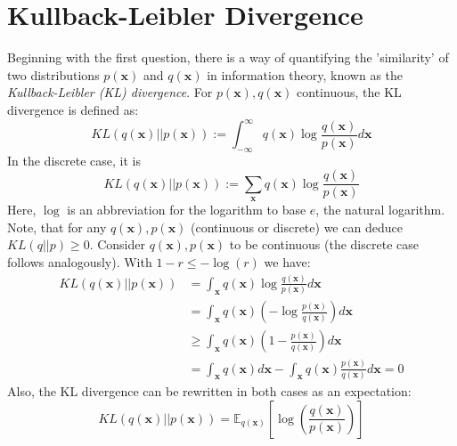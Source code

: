 \documentclass[12pt]{report}
\theoremstyle{definition}
\begin{document}
\section{Kullback-Leibler Divergence}
Beginning with the first question, there is a way of quantifying the 'similarity' of two distributions $p(\mathbf{x})$ and $q(\mathbf{x})$ in information theory, known as the \emph{Kullback-Leibler (KL) divergence}. For $p(\mathbf{x}), q(\mathbf{x})$ continuous, the KL divergence is defined as:
\begin{equation}
	KL(q(\mathbf{x})||p(\mathbf{x})) := \int_{-\infty}^{\infty} q(\mathbf{x}) \log \frac{q(\mathbf{x})}{p(\mathbf{x})} d \mathbf{x}
\end{equation}
In the discrete case, it is
\begin{equation}
	KL(q(\mathbf{x})||p(\mathbf{x})) := \sum_{\mathbf{x}} q(\mathbf{x}) \log \frac{q(\mathbf{x})}{p(\mathbf{x})}
\end{equation}
Here, $\log$ is an abbreviation for the logarithm to base $e$, the natural logarithm. Note, that for any $q(\mathbf{x}), p(\mathbf{x})$ (continuous or discrete) we can deduce $KL(q||p) \geq 0$.
Consider $q(\mathbf{x}), p(\mathbf{x})$ to be continuous (the discrete case follows analogously). With $1 - r \leq -\log(r)$ we have:
\begin{equation}
\begin{split}
KL(q(\mathbf{x})||p(\mathbf{x}))
& = \int_{\mathbf{x}} q(\mathbf{x}) \log \frac{q(\mathbf{x})}{p(\mathbf{x})} d \mathbf{x} \\
& = \int_{\mathbf{x}} q(\mathbf{x}) (- \log \frac{p(\mathbf{x})}{q(\mathbf{x})}) d \mathbf{x} \\
& \geq \int_{\mathbf{x}} q(\mathbf{x}) (1 - \frac{p(\mathbf{x})}{q(\mathbf{x})}) d \mathbf{x} \\
& = \int_{\mathbf{x}} q(\mathbf{x}) d \mathbf{x} - \int_{\mathbf{x}} q(\mathbf{x}) \frac{p(\mathbf{x})}{q(\mathbf{x})} d \mathbf{x} = 0
\end{split}
\end{equation}
Also, the KL divergence can be rewritten in both cases as an expectation:
\begin{equation}
	KL(q(\mathbf{x})||p(\mathbf{x})) = \mathbb{E}_{q(\mathbf{x})}\left[ \log\left(\frac{q(\mathbf{x})}{p(\mathbf{x})} \right) \right]
\end{equation}
\end{document}
